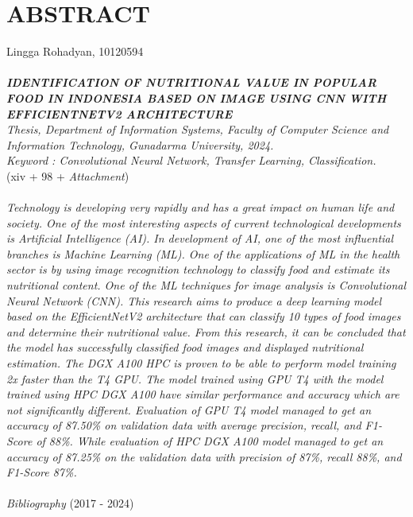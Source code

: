 \chapter*{ABSTRACT}
\begin{singlespace}
    \noindent
    Lingga Rohadyan, 10120594 \\ \\
    \textbf{\textit{IDENTIFICATION OF NUTRITIONAL VALUE IN POPULAR FOOD IN INDONESIA BASED ON IMAGE USING CNN WITH EFFICIENTNETV2 ARCHITECTURE}}\\
    \textit{Thesis, Department of Information Systems, Faculty of Computer Science and Information Technology, Gunadarma University, 2024.}\\
    \textit{Keyword : Convolutional Neural Network, Transfer Learning, Classification.}\\
    (xiv + 98 + \textit{Attachment}) \\ \\
    \textit{Technology is developing very rapidly and has a great impact on human life and society. One of the most interesting aspects of current technological developments is Artificial Intelligence (AI). In development of AI, one of the most influential branches is Machine Learning (ML). One of the applications of ML in the health sector is by using image recognition technology to classify food and estimate its nutritional content. One of the ML techniques for image analysis is Convolutional Neural Network (CNN). This research aims to produce a deep learning model based on the EfficientNetV2 architecture that can classify 10 types of food images and determine their nutritional value. From this research, it can be concluded that the model has successfully classified food images and displayed nutritional estimation. The DGX A100 HPC is proven to be able to perform model training 2x faster than the T4 GPU. The model trained using GPU T4 with the model trained using HPC DGX A100 have similar performance and accuracy which are not significantly different. Evaluation of GPU T4 model managed to get an accuracy of 87.50\% on validation data with average precision, recall, and F1-Score of 88\%. While evaluation of HPC DGX A100 model managed to get an accuracy of 87.25\% on the validation data with precision of 87\%, recall 88\%, and F1-Score 87\%.}  \\ \\
    \textit{Bibliography} (2017 - 2024)
\end{singlespace}
\pagebreak